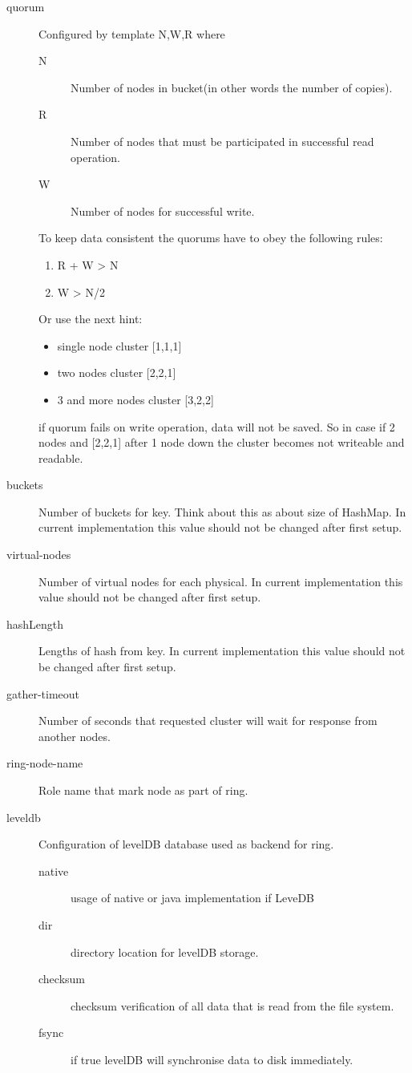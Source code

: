 \begin{description}
  \item[quorum] Configured by template N,W,R where
  \begin{description}
    \item[N] Number of nodes in bucket(in other words the number of copies).
    \item[R] Number of nodes that must  be participated in successful read operation.
    \item[W] Number of nodes for successful write.
  \end{description}
  To keep data consistent the quorums have to obey the following rules:
  \begin{enumerate}
    \item R + W > N
    \item W > N/2
  \end{enumerate}
  Or use the next hint:
  \begin{itemize}
    \item single node cluster [1,1,1]
    \item two nodes cluster [2,2,1]
    \item 3 and more nodes cluster [3,2,2]
  \end{itemize}
  if quorum fails on write operation, data will not be saved. So in case if 2 nodes and [2,2,1] after 1 node down the cluster becomes not writeable and readable.
  \item[buckets] Number of buckets for key. Think about this as about size of HashMap. In current implementation this value should not be changed after first setup.
  \item[virtual-nodes] Number of virtual nodes for each physical. In current implementation this value should not be changed after first setup.
  \item[hashLength] Lengths of hash from key. In current implementation this value should not be changed after first setup.
  \item[gather-timeout] Number of seconds that requested cluster will wait for response from another nodes.
  \item[ring-node-name] Role name that mark node as part of ring.
  \item[leveldb] Configuration of levelDB database used as backend for ring.
  \begin{description}
    \item[native] usage of native or java implementation if LeveDB
    \item[dir] directory location for levelDB storage.
    \item[checksum] checksum verification of all data that is read from the file system.
    \item[fsync] if true levelDB will synchronise data to disk immediately.
  \end{description}
\end{description}

